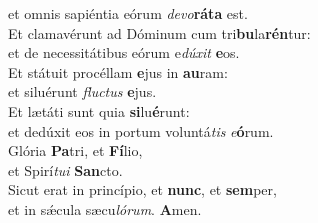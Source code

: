 \oddverse et omnis sapiéntia eórum \textit{de}\textit{vo}\textbf{rá}\textbf{ta} est.\\
\evenverse Et clamavérunt ad Dóminum cum tri\textbf{bu}la\textbf{rén}tur:~\*\\
\evenverse et de necessitátibus eórum e\textit{dú}\textit{xit} \textbf{e}os.\\
\oddverse Et státuit procéllam \textbf{e}jus in \textbf{au}ram:~\*\\
\oddverse et siluérunt \textit{flu}\textit{ctus} \textbf{e}jus.\\
\evenverse Et lætáti sunt quia \textbf{si}lu\textbf{é}runt:~\*\\
\evenverse et dedúxit eos in portum voluntá\textit{tis} \textit{e}\textbf{ó}rum.\\
\oddverse Glória \textbf{Pa}tri, et \textbf{Fí}lio,~\*\\
\oddverse et Spirí\textit{tu}\textit{i} \textbf{San}cto.\\
\evenverse Sicut erat in princípio, et \textbf{nunc}, et \textbf{sem}per,~\*\\
\evenverse et in sǽcula sæcu\textit{ló}\textit{rum}. \textbf{A}men.\\
